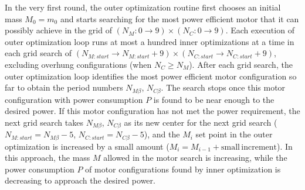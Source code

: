     
    In the very first round, the outer optimization routine first chooses an initial mass $M_0 = m_0$ and starts searching for the most power efficient motor that it can possibly achieve in the grid of $(N_M:0\rightarrow9)\times (N_C:0\rightarrow9)$. Each execution of outer optimization loop runs at most a hundred inner optimizations at a time in each grid search of $\left(N_{M:start}\rightarrow N_{M:start}+9\right)\times\left(N_{C:start}\rightarrow N_{C:start}+9\right)$, excluding overhung configurations (when $N_C \geq N_M$). After each grid search, the outer optimization loop identifies the most power efficient motor configuration so far to obtain the period numbers $N_{M\beta}$, $N_{C\beta}$. The search stops once this motor configuration with power consumption $P$ is found to be near enough to the desired power. If this motor configuration has not met the power requirement, the next grid search takes $N_{M\beta}$, $N_{C\beta}$ as its new center for the next grid search ($N_{M:start}=N_{M\beta}-5$, $N_{C:start}=N_{C\beta}-5$), and the $M_i$ set point in the outer optimization is increased by a small amount ($M_i=M_{i-1}+\mathrm{small\,increment}$). In this approach, the mass $M$ allowed in the motor search is increasing, while the power consumption $P$ of motor configurations found by inner optimization is decreasing to approach the desired power. 
    
